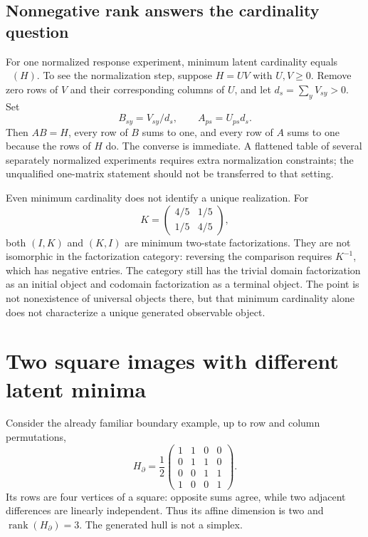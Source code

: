 \documentclass[11pt]{article}
\DeclareMathOperator{\rank}{rank}
\DeclareMathOperator{\nnrank}{rank_+}
\begin{document}
\subsection{Nonnegative rank answers the cardinality question}
For one normalized response experiment, minimum latent cardinality equals $\nnrank(H)$. To see the normalization step, suppose $H=UV$ with $U,V\geq0$. Remove zero rows of $V$ and their corresponding columns of $U$, and let $d_s=\sum_yV_{sy}>0$. Set
\[
 B_{sy}=V_{sy}/d_s,\qquad A_{ps}=U_{ps}d_s.
\]
Then $AB=H$, every row of $B$ sums to one, and every row of $A$ sums to one because the rows of $H$ do. The converse is immediate. A flattened table of several separately normalized experiments requires extra normalization constraints; the unqualified one-matrix statement should not be transferred to that setting.

Even minimum cardinality does not identify a unique realization. For
\[
 K=\begin{pmatrix}4/5&1/5\\1/5&4/5\end{pmatrix},
\]
 both $(I,K)$ and $(K,I)$ are minimum two-state factorizations. They are not isomorphic in the factorization category: reversing the comparison requires $K^{-1}$, which has negative entries. The category still has the trivial domain factorization as an initial object and codomain factorization as a terminal object. The point is not nonexistence of universal objects there, but that minimum cardinality alone does not characterize a unique generated observable object.

\section{Two square images with different latent minima}
\label{sec:squares}

Consider the already familiar boundary example, up to row and column permutations,
\[
 H_{\partial}=\frac12
 \begin{pmatrix}
 1&1&0&0\\0&1&1&0\\0&0&1&1\\1&0&0&1
 \end{pmatrix}.
\]
Its rows are four vertices of a square: opposite sums agree, while two adjacent differences are linearly independent. Thus its affine dimension is two and $\rank(H_{\partial})=3$. The generated hull is not a simplex.
\end{document}
